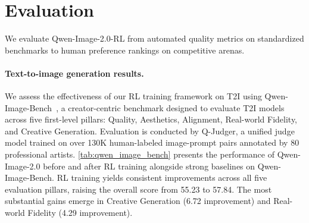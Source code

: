 \documentclass{article} %
\begin{document}
\section{Evaluation}
\label{sec:evaluation}

We evaluate Qwen-Image-2.0-RL from automated quality metrics on standardized benchmarks to human preference rankings on competitive arenas.

\paragraph{Text-to-image generation results.} We assess the effectiveness of our RL training framework on T2I using Qwen-Image-Bench~\citep{li2026qwen}, a creator-centric benchmark designed to evaluate T2I models across five first-level pillars: Quality, Aesthetics, Alignment, Real-world Fidelity, and Creative Generation. Evaluation is conducted by Q-Judger, a unified judge model trained on over 130K human-labeled image-prompt pairs annotated by 80 professional artists. 
\cref{tab:qwen_image_bench} presents the performance of Qwen-Image-2.0 before and after RL training alongside strong baselines on Qwen-Image-Bench. RL training yields consistent improvements across all five evaluation pillars, raising the overall score from 55.23 to 57.84. The most substantial gains emerge in Creative Generation (6.72 improvement) and Real-world Fidelity (4.29 improvement).
\end{document}
